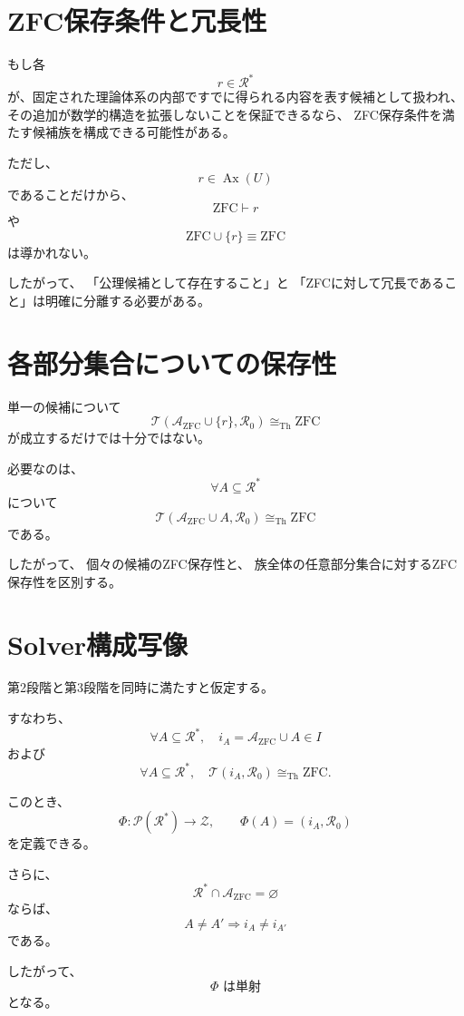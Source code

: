 \documentclass[11pt,a4paper]{article}
\begin{document}
\section{ZFC保存条件と冗長性}

もし各
\[
r\in\mathcal{R}^*
\]
が、固定された理論体系の内部ですでに得られる内容を表す候補として扱われ、
その追加が数学的構造を拡張しないことを保証できるなら、
ZFC保存条件を満たす候補族を構成できる可能性がある。

ただし、
\[
r\in\operatorname{Ax}(U)
\]
であることだけから、
\[
\mathrm{ZFC}\vdash r
\]
や
\[
\mathrm{ZFC}\cup\{r\}\equiv\mathrm{ZFC}
\]
は導かれない。

したがって、
「公理候補として存在すること」と
「ZFCに対して冗長であること」は明確に分離する必要がある。

\section{各部分集合についての保存性}

単一の候補について
\[
\mathcal{T}(\mathcal{A}_{\mathrm{ZFC}}\cup\{r\},\mathcal{R}_0)
\cong_{\mathrm{Th}}\mathrm{ZFC}
\]
が成立するだけでは十分ではない。

必要なのは、
\[
\forall A\subseteq\mathcal{R}^*
\]
について
\[
\mathcal{T}(\mathcal{A}_{\mathrm{ZFC}}\cup A,\mathcal{R}_0)
\cong_{\mathrm{Th}}\mathrm{ZFC}
\]
である。

したがって、
個々の候補のZFC保存性と、
族全体の任意部分集合に対するZFC保存性を区別する。

\section{Solver構成写像}

第2段階と第3段階を同時に満たすと仮定する。

すなわち、
\[
\forall A\subseteq\mathcal{R}^*,
\quad
i_A=\mathcal{A}_{\mathrm{ZFC}}\cup A\in I
\]
および
\[
\forall A\subseteq\mathcal{R}^*,
\quad
\mathcal{T}(i_A,\mathcal{R}_0)
\cong_{\mathrm{Th}}\mathrm{ZFC}.
\]

このとき、
\[
\boxed{
\Phi:
\mathcal{P}(\mathcal{R}^*)
\longrightarrow
\mathcal{Z},
\qquad
\Phi(A)=(i_A,\mathcal{R}_0)
}
\]
を定義できる。

さらに、
\[
\mathcal{R}^*\cap\mathcal{A}_{\mathrm{ZFC}}=\varnothing
\]
ならば、
\[
A\neq A'
\Longrightarrow
i_A\neq i_{A'}
\]
である。

したがって、
\[
\boxed{
\Phi\text{ は単射}
}
\]
となる。
\end{document}
